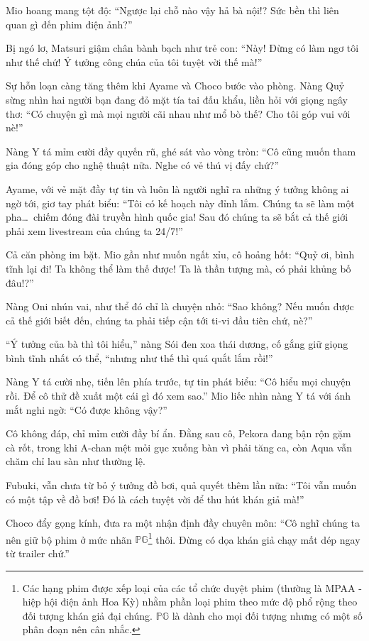\documentclass[../main.tex]{subfiles}
\begin{document}
Mio hoang mang tột độ: ``Ngược lại chỗ nào vậy hả bà nội!? Sức bền thì liên quan gì đến phim điện ảnh?''

Bị ngó lơ, Matsuri giậm chân bành bạch như trẻ con: ``Này! Đừng có làm ngơ tôi như thế chứ! Ý tưởng công chúa của tôi tuyệt vời thế mà!''

Sự hỗn loạn càng tăng thêm khi Ayame và Choco bước vào phòng. Nàng Quỷ sừng nhìn hai người bạn đang đỏ mặt tía tai đấu khẩu, liền hỏi với giọng ngây thơ: ``Có chuyện gì mà mọi người cãi nhau như mổ bò thế? Cho tôi góp vui với nè!''

Nàng Y tá mỉm cười đầy quyến rũ, ghé sát vào vòng tròn: ``Cô cũng muốn tham gia đóng góp cho nghệ thuật nữa. Nghe có vẻ thú vị đấy chứ?''

Ayame, với vẻ mặt đầy tự tin và luôn là người nghĩ ra những ý tưởng không ai ngờ tới, giơ tay phát biểu: ``Tôi có kế hoạch này đỉnh lắm. Chúng ta sẽ làm một pha\dots\ chiếm đóng đài truyền hình quốc gia! Sau đó chúng ta sẽ bắt cả thế giới phải xem livestream của chúng ta 24/7!''


Cả căn phòng im bặt. Mio gần như muốn ngất xỉu, cô hoảng hốt: ``Quỷ ơi, bình tĩnh lại đi! Ta không thể làm thế được! Ta là thần tượng mà, có phải khủng bố đâu!?''

Nàng Oni nhún vai, như thể đó chỉ là chuyện nhỏ: ``Sao không? Nếu muốn được cả thế giới biết đến, chúng ta phải tiếp cận tới ti-vi đầu tiên chứ, nè?''

``Ý tưởng của bà thì tôi hiểu,'' nàng Sói đen xoa thái dương, cố gắng giữ giọng bình tĩnh nhất có thể, ``nhưng như thế thì quá quắt lắm rồi!''

Nàng Y tá cười nhẹ, tiến lên phía trước, tự tin phát biểu: ``Cô hiểu mọi chuyện rồi. Để cô thử đề xuất một cái gì đó xem sao.'' Mio liếc nhìn nàng Y tá với ánh mắt nghi ngờ: ``Có được không vậy?''

Cô không đáp, chỉ mỉm cười đầy bí ẩn. Đằng sau cô, Pekora đang bận rộn gặm cà rốt, trong khi A-chan mệt mỏi gục xuống bàn vì phải tăng ca, còn Aqua vẫn chăm chỉ lau sàn như thường lệ.

Fubuki, vẫn chưa từ bỏ ý tưởng đồ bơi, quả quyết thêm lần nữa: ``Tôi vẫn muốn có một tập về đồ bơi! Đó là cách tuyệt vời để thu hút khán giả mà!''

Choco đẩy gọng kính, đưa ra một nhận định đầy chuyên môn: ``Cô nghĩ chúng ta nên giữ bộ phim ở mức nhãn \(\mathbb{PG}\)\footnote{Các hạng phim được xếp loại của các tổ chức duyệt phim (thường là MPAA - hiệp hội điện ảnh Hoa Kỳ) nhằm phần loại phim theo mức độ phổ rộng theo đối tượng khán giả đại chúng. \(\mathbb{PG}\) là dành cho mọi đối tượng nhưng có một số phân đoạn nên cân nhắc.} thôi. Đừng có dọa khán giả chạy mất dép ngay từ trailer chứ.''
\end{document}
